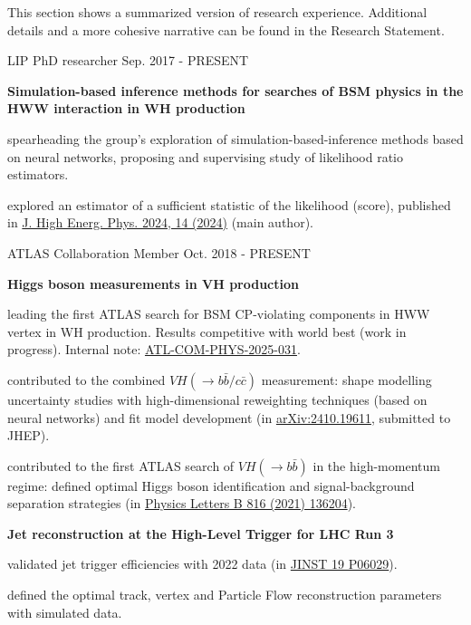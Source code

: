 
This section shows a summarized version of research experience. Additional details and a more cohesive narrative can be found in the Research Statement.

\begin{cventries}

    \cventry
    {LIP}
    {PhD researcher}
    {}
    {Sep. 2017 - PRESENT}
    {
        \textbf{Simulation-based inference methods for searches of BSM physics in the HWW interaction in WH production}\vspace{12pt}
        \begin{cvitems}      
            \item {spearheading the group's exploration of simulation-based-inference methods based on neural networks, proposing and supervising study of likelihood ratio estimators.}
            \item {explored an estimator of a sufficient statistic of the likelihood (score), published in \href{https://doi.org/10.1007/JHEP04(2024)014}{J. High Energ. Phys. 2024, 14 (2024)} (main author).}
        \end{cvitems}
    }

    \cventry
    {ATLAS Collaboration}
    {Member}
    {}
    {Oct. 2018 - PRESENT}
    {
        \textbf{Higgs boson measurements in VH production}\vspace{14pt}
        \begin{cvitems}
            \item {leading the first ATLAS search for BSM CP-violating components in HWW vertex in WH production. Results competitive with world best (work in progress). Internal note: \href{https://cds.cern.ch/record/2921718}{ATL-COM-PHYS-2025-031}.}
            \item {contributed to the combined $VH(\to b\bar{b}/c\bar{c})$ measurement: shape modelling uncertainty studies with high-dimensional reweighting techniques (based on neural networks) and fit model development (in \href{https://arxiv.org/abs/2410.19611}{arXiv:2410.19611}, submitted to JHEP).}
            \item {contributed to the first ATLAS search of $VH(\to b\bar{b})$ in the high-momentum regime: defined optimal Higgs boson identification and signal-background separation strategies (in \href{https://doi.org/10.1016/j.physletb.2021.136204}{Physics Letters B 816 (2021) 136204}).}
        \end{cvitems}\vspace{19pt}
        \textbf{Jet reconstruction at the High-Level Trigger for LHC Run 3}\vspace{14pt}
        \begin{cvitems}
            \item {validated jet trigger efficiencies with 2022 data (in \href{https://doi.org/10.1088/1748-0221/19/06/P06029}{JINST 19 P06029}).}
            \item {defined the optimal track, vertex and Particle Flow reconstruction parameters with simulated data.}
        \end{cvitems}
    }

\end{cventries}